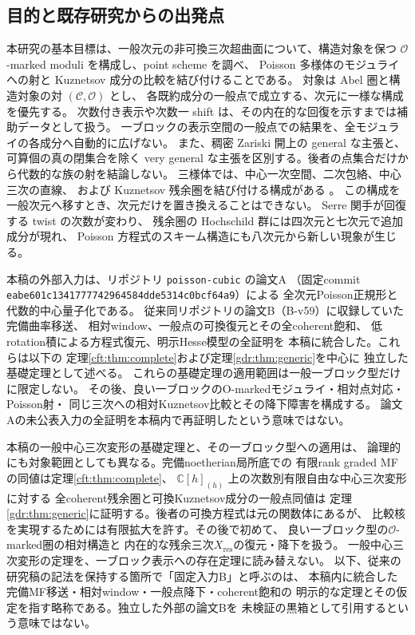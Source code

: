 \documentclass[11pt,a4paper]{ltjsarticle}
\numberwithin{equation}{section}
\begin{document}
\subsection{目的と既存研究からの出発点}
本研究の基本目標は、一般次元の非可換三次超曲面について、構造対象を保つ
$\mathcal O$-marked moduli を構成し、point scheme を調べ、
Poisson 多様体のモジュライへの射と Kuznetsov 成分の比較を結び付けることである。
対象は Abel 圏と構造対象の対 $(\mathcal C,\mathcal O)$ とし、
各既約成分の一般点で成立する、次元に一様な構成を優先する。
次数付き表示や次数一 shift は、その内在的な回復を示すまでは補助データとして扱う。
一ブロックの表示空間の一般点での結果を、全モジュライの各成分へ自動的に広げない。
また、稠密 Zariski 開上の general な主張と、可算個の真の閉集合を除く
very general な主張を区別する。後者の点集合だけから代数的な族の射を結論しない。
三様体では、中心一次空間、二次包絡、中心三次の直線、
および Kuznetsov 残余圏を結び付ける構成がある \cite{Threefold}。
この構成を一般次元へ移すとき、次元だけを置き換えることはできない。
Serre 関手が回復する twist の次数が変わり、
残余圏の Hochschild 群には四次元と七次元で追加成分が現れ、
Poisson 方程式のスキーム構造にも八次元から新しい現象が生じる。

本稿の外部入力は、リポジトリ \texttt{poisson-cubic} の論文A
\cite{NCCubicA}（固定commit
\texttt{eabe601c1341777742964584dde5314c0bcf64a9}）による
全次元Poisson正規形と代数的中心量子化である。
従来同リポジトリの論文B（B-v59）に収録していた完備曲率移送、
相対window、一般点の可換復元とその全coherent飽和、
低rotation積による方程式復元、明示Hesse模型の全証明を
本稿に統合した。これらは以下の
定理\ref{cft:thm:complete}および定理\ref{gdr:thm:generic}を中心に
独立した基礎定理として述べる。
これらの基礎定理の適用範囲は一般一ブロック型だけに限定しない。
その後、良い一ブロックのO-markedモジュライ・相対点対応・Poisson射・
同じ三次への相対Kuznetsov比較とその降下障害を構成する。
論文Aの未公表入力の全証明を本稿内で再証明したという意味ではない。

本稿の一般中心三次変形の基礎定理と、その一ブロック型への適用は、
論理的にも対象範囲としても異なる。完備noetherian局所底での
有限rank graded MF の同値は定理\ref{cft:thm:complete}、
$\mathbb C[h]_{(h)}$ 上の次数別有限自由な中心三次変形に対する
全coherent残余圏と可換Kuznetsov成分の一般点同値は
定理\ref{gdr:thm:generic}に証明する。後者の可換方程式は元の関数体にあるが、
比較核を実現するためには有限拡大を許す。その後で初めて、
良い一ブロック型の$\mathcal O$-marked圏の相対構造と
内在的な残余三次$X_{\mathrm{res}}$の復元・降下を扱う。
一般中心三次変形の定理を、一ブロック表示への存在定理に読み替えない。
以下、従来の研究稿の記法を保持する箇所で「固定入力B」と呼ぶのは、
本稿内に統合した完備MF移送・相対window・一般点降下・coherent飽和の
明示的な定理とその仮定を指す略称である。独立した外部の論文Bを
未検証の黒箱として引用するという意味ではない。
\end{document}
